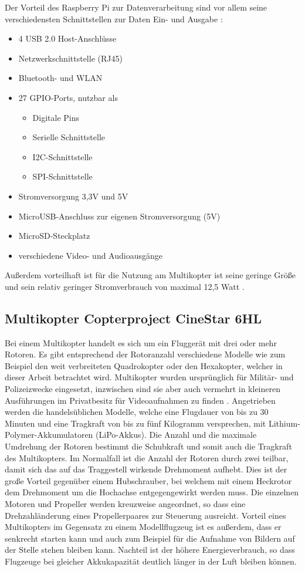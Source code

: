 \documentclass[a4paper,12pt,bibliography=totoc, listof=totoc,titlepage,pointlessnumbers]{scrreprt}
\begin{document}
Der Vorteil des Raspberry Pi zur Datenverarbeitung sind vor allem seine verschiedensten Schnittstellen zur Daten Ein- und Ausgabe \citep{raspSheet}:
\begin{itemize}
 \item 4 USB 2.0 Host-Anschlüsse
 \item Netzwerkschnittstelle (RJ45)
 \item Bluetooth- und WLAN
 \item 27 GPIO-Ports, nutzbar als \citep{ekRaspPin}
 \begin{itemize} 
  \item Digitale Pins
  \item Serielle Schnittstelle
  \item I2C-Schnittstelle
  \item SPI-Schnittstelle
 \end{itemize}
 \item Stromversorgung 3,3V und 5V
 \item MicroUSB-Anschluss zur eigenen Stromversorgung (5V)
 \item MicroSD-Steckplatz 
 \item verschiedene Video- und Audioausgänge
 \end{itemize}

Außerdem vorteilhaft ist für die Nutzung am Multikopter ist seine geringe 
Größe und sein relativ geringer Stromverbrauch von maximal 12,5 
Watt \citep{raspSheet}.

\subsection{Multikopter Copterproject CineStar 6HL}
Bei einem Multikopter handelt es sich um ein Fluggerät mit drei oder mehr Rotoren. Es gibt entsprechend der Rotoranzahl verschiedene Modelle wie zum Beispiel den weit verbreiteten Quadrokopter oder den Hexakopter, welcher in dieser Arbeit betrachtet wird. Multikopter wurden ursprünglich für Militär- und Polizeizwecke eingesetzt, inzwischen sind sie aber auch vermehrt in kleineren Ausführungen im Privatbesitz für Videoaufnahmen zu finden \citep{Quadro}. Angetrieben werden die handelsüblichen Modelle, welche eine Flugdauer von bis zu 30 Minuten und eine Tragkraft von bis zu fünf Kilogramm versprechen, mit Lithium-Polymer-Akkumulatoren (LiPo-Akkus). Die Anzahl und die maximale Umdrehung der Rotoren bestimmt die Schubkraft und somit auch die Tragkraft des Multikopters. Im Normalfall ist die Anzahl der Rotoren durch zwei teilbar, damit sich das auf das Traggestell wirkende Drehmoment aufhebt. Dies ist der große Vorteil gegenüber einem Hubschrauber, bei welchem mit einem Heckrotor dem Drehmoment um die Hochachse entgegengewirkt werden muss. Die einzelnen Motoren und Propeller werden kreuzweise angeordnet, so dass eine Drehzahländerung eines Propellerpaares zur Steuerung ausreicht. Vorteil eines Multikopters im Gegensatz zu einem Modellflugzeug ist es außerdem, dass er senkrecht starten kann und auch zum Beispiel für die Aufnahme von Bildern auf der Stelle stehen bleiben kann. Nachteil ist der höhere Energieverbrauch, so dass Flugzeuge bei gleicher Akkukapazität deutlich länger in der Luft bleiben können. \citep{Bachfeld}
\end{document}
